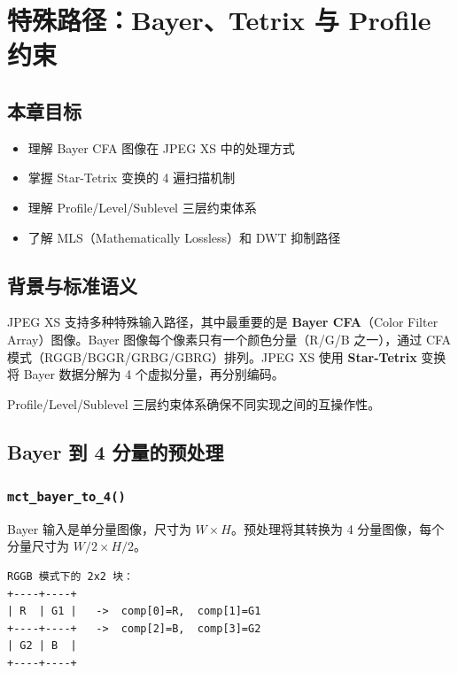 
\chapter{特殊路径：Bayer、Tetrix 与 Profile 约束}\label{ch:special-paths}

\section{本章目标}

\begin{itemize}
  \item 理解 Bayer CFA 图像在 JPEG XS 中的处理方式
  \item 掌握 Star-Tetrix 变换的 4 遍扫描机制
  \item 理解 Profile/Level/Sublevel 三层约束体系
  \item 了解 MLS（Mathematically Lossless）和 DWT 抑制路径
\end{itemize}

\section{背景与标准语义}

JPEG XS 支持多种特殊输入路径，其中最重要的是 \textbf{Bayer CFA}（Color Filter Array）图像。Bayer 图像每个像素只有一个颜色分量（R/G/B 之一），通过 CFA 模式（RGGB/BGGR/GRBG/GBRG）排列。JPEG XS 使用 \textbf{Star-Tetrix} 变换将 Bayer 数据分解为 4 个虚拟分量，再分别编码。

Profile/Level/Sublevel 三层约束体系确保不同实现之间的互操作性。

\section{Bayer 到 4 分量的预处理}

\subsection{\texttt{mct\_bayer\_to\_4()}}

Bayer 输入是单分量图像，尺寸为 $W \times H$。预处理将其转换为 4 分量图像，每个分量尺寸为 $W/2 \times H/2$。

\begin{lstlisting}[numbers=none]
RGGB 模式下的 2x2 块：
+----+----+
| R  | G1 |   ->  comp[0]=R,  comp[1]=G1
+----+----+   ->  comp[2]=B,  comp[3]=G2
| G2 | B  |
+----+----+
\end{lstlisting}

